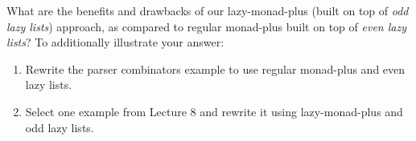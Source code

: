 \documentclass{article}
\newcommand{\tmem}[1]{{\em #1\/}}
\begin{document}
\begin{exercise}
  What are the benefits and drawbacks of our lazy-monad-plus (built on top of
  {\tmem{odd lazy lists}}) approach, as compared to regular monad-plus built
  on top of {\tmem{even lazy lists}}? To additionally illustrate your answer:
  \begin{enumerate}
    \item Rewrite the parser combinators example to use regular monad-plus and
    even lazy lists.
    
    \item Select one example from Lecture 8 and rewrite it using
    lazy-monad-plus and odd lazy lists.
  \end{enumerate}
\end{exercise}

\
\end{document}
